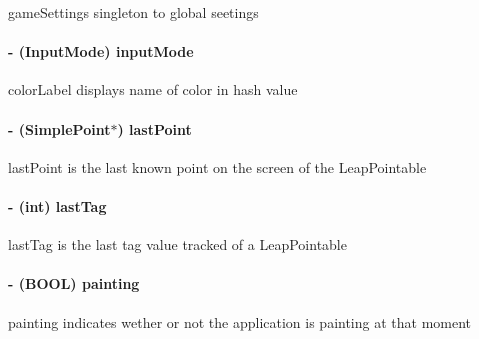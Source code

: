 game\-Settings singleton to global seetings \hypertarget{interface_game_manager_a43f8cf09eea5b0766c73b0d2b258644c}{
\paragraph[{input\-Mode}]{\setlength{\rightskip}{0pt plus 5cm}-\/ (Input\-Mode) input\-Mode\hspace{0.3cm}{\ttfamily [protected]}}}\label{d4/d94/interface_game_manager_a43f8cf09eea5b0766c73b0d2b258644c}
color\-Label displays name of color in hash value \hypertarget{interface_game_manager_a4f2a6986ffdbc41d661e90deaee4551a}{
\paragraph[{last\-Point}]{\setlength{\rightskip}{0pt plus 5cm}-\/ ({\bf Simple\-Point}$\ast$) last\-Point\hspace{0.3cm}{\ttfamily [protected]}}}\label{d4/d94/interface_game_manager_a4f2a6986ffdbc41d661e90deaee4551a}
last\-Point is the last known point on the screen of the Leap\-Pointable \hypertarget{interface_game_manager_a0b83b09829718f85c17d64f6ee06d441}{
\paragraph[{last\-Tag}]{\setlength{\rightskip}{0pt plus 5cm}-\/ (int) last\-Tag\hspace{0.3cm}{\ttfamily [protected]}}}\label{d4/d94/interface_game_manager_a0b83b09829718f85c17d64f6ee06d441}
last\-Tag is the last tag value tracked of a Leap\-Pointable \hypertarget{interface_game_manager_a71f6112c6ebea5c0083db68cdb0e01d8}{
\paragraph[{painting}]{\setlength{\rightskip}{0pt plus 5cm}-\/ (B\-O\-O\-L) painting\hspace{0.3cm}{\ttfamily [protected]}}}\label{d4/d94/interface_game_manager_a71f6112c6ebea5c0083db68cdb0e01d8}
painting indicates wether or not the application is painting at that moment 

